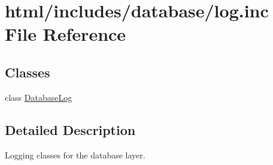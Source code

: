 \hypertarget{log_8inc}{
\section{html/includes/database/log.inc File Reference}
\label{log_8inc}
}
\subsection*{Classes}
\begin{DoxyCompactItemize}
\item 
class \hyperlink{classDatabaseLog}{DatabaseLog}
\end{DoxyCompactItemize}


\subsection{Detailed Description}
Logging classes for the database layer. 